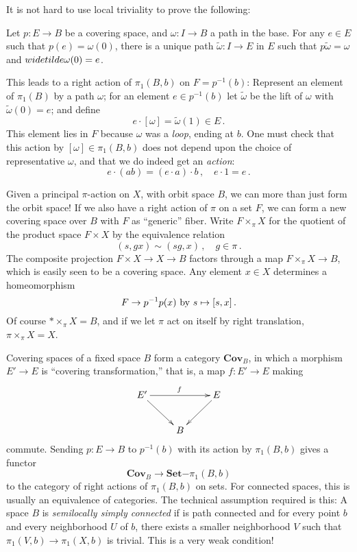 It is not hard to use local triviality to prove the following:
\begin{theorem}
Let $p:E\to B$ be a covering space, and $\omega:I\to B$ a path in the base.
For any $e\in E$ such that $p(e)=\omega(0)$, there is a unique path 
$\widetilde\omega:I\to E$ in $E$ such that $p\widetilde\omega=\omega$ and
$\\widetilde\omega(0)=e$. 
\end{theorem}

This leads to a right action of $\pi_1(B,b)$ on $F=p^{-1}(b)$: Represent an 
element of $\pi_1(B)$ by a path $\omega$; for an element $e\in p^{-1}(b)$
let $\widetilde\omega$ be the lift of $\omega$ with $\widetilde\omega(0)=e$;
and define 
\[
e\cdot[\omega]=\widetilde\omega(1)\in E\,.
\]
This element lies in $F$ because $\omega$ was a {\em loop}, ending at $b$. 
One must check that this action by $[\omega]\in\pi_1(B,b)$ does not depend 
upon the choice of representative $\omega$, and that we do indeed get an 
{\em action}:
\[
e\cdot(ab)=(e\cdot a)\cdot b\,,\quad e\cdot1=e\,.
\]

Given a principal $\pi$-action on $X$, with orbit space $B$, 
we can more than just form the orbit space!
If we also have a right action of $\pi$ on a set $F$, we can form a new
covering space over $B$ with $F$ as ``generic'' fiber. 
Write $F\times_\pi X$ for the quotient of the product space $F\times X$ by 
the equivalence relation
\[
(s,gx)\sim(sg,x)\,,\quad g\in\pi\,.
\]
The composite projection $F\times X\to X\to B$ factors through a map
$F\times_\pi X\to B$, which is easily seen to be a covering space. 
Any element $x\in X$ determines a homeomorphism 
\[
F\to p^{-1}p(x)\,\,\hbox{by}\,\, s\mapsto[s,x]\,.
\]
Of course $\ast\times_\pi X=B$, and if we let $\pi$ act on itself by
right translation, $\pi\times_\pi X=X$. 

Covering spaces of a fixed space $B$ form a category $\mathbf{Cov}_B$,
in which a morphism $E'\to E$ is ``covering transformation,'' that is,
a map $f:E'\to E$ making
\[
\xymatrix{
E' \ar[rr]^f \ar[dr] && E \ar[dl] \\
& B
}\]
commute. 
Sending $p:E\to B$ to $p^{-1}(b)$ with its action by $\pi_1(B,b)$ gives
a functor
\[
\mathbf{Cov}_B\to \mathbf{Set}\mathrm{-}\pi_1(B,b)
\]
to the category of right actions of $\pi_1(B,b)$ on sets. For connected
spaces, this is usually an equivalence of categories. The technical
assumption required is this: A space $B$ is {\em semilocally simply 
connected} if is path connected and for every point $b$ and every 
neighborhood $U$ of $b$, there exists a smaller neighborhood $V$ 
such that $\pi_1(V,b)\to\pi_1(X,b)$ is trivial. This is a very weak
condition! 

